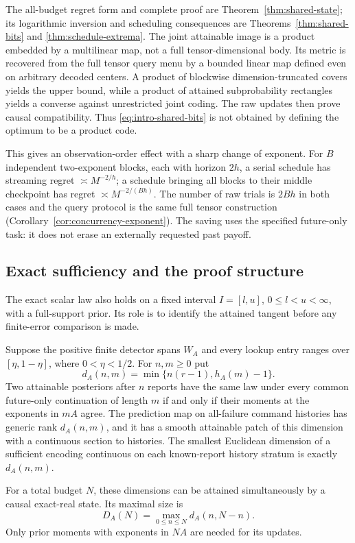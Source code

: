 The all-budget regret form and complete proof are
Theorem~\ref{thm:shared-state}; its logarithmic inversion and scheduling
consequences are Theorems~\ref{thm:shared-bits} and
\ref{thm:schedule-extrema}. The joint attainable image is a product
embedded by a multilinear map, not a full tensor-dimensional body.
Its metric is recovered from the full tensor query menu by a bounded
linear map defined even on arbitrary decoded centers. A product of
blockwise dimension-truncated covers yields the upper bound, while a
product of attained subprobability rectangles yields a converse against
unrestricted joint coding. The raw updates then prove causal compatibility.
Thus \eqref{eq:intro-shared-bits} is not obtained by defining the optimum
to be a product code.

This gives an observation-order effect with a sharp change of exponent.
For $B$ independent two-exponent blocks, each with horizon $2h$, a serial
schedule has streaming regret $\asymp M^{-2/h}$; a schedule bringing
all blocks to their middle checkpoint has regret
$\asymp M^{-2/(Bh)}$. The number of raw trials is $2Bh$ in both
cases and the query protocol is the same full tensor construction
(Corollary~\ref{cor:concurrency-exponent}). The saving uses the specified
future-only task: it does not erase an externally requested past payoff.

\subsection{Exact sufficiency and the proof structure}
The exact scalar law also holds on a fixed interval $I=[l,u]$,
$0\le l<u<\infty$, with a full-support prior. Its role is to identify
the attained tangent before any finite-error comparison is made.

\begin{theorem}\label{thm:main}
Suppose the positive finite detector spans $W_A$ and every lookup entry
ranges over $[\eta,1-\eta]$, where $0<\eta<1/2$. For $n,m\ge0$ put
\begin{equation}\label{eq:main-dimension}
 d_A(n,m)=\min\{n(r-1),h_A(m)-1\}.
\end{equation}
Two attainable posteriors after $n$ reports have the same law under every
common future-only continuation of length $m$ if and only if their moments
at the exponents in $mA$ agree. The prediction map on all-failure command
histories has generic rank $d_A(n,m)$, and it has a smooth attainable patch
of this dimension with a continuous section to histories. The smallest
Euclidean dimension of a sufficient encoding continuous on each
known-report history stratum is exactly $d_A(n,m)$.

For a total budget $N$, these dimensions can be attained simultaneously
by a causal exact-real state. Its maximal size is
\begin{equation}\label{eq:peak}
 D_A(N)=\max_{0\le n\le N}d_A(n,N-n).
\end{equation}
Only prior moments with exponents in $NA$ are needed for its updates.
\end{theorem}

